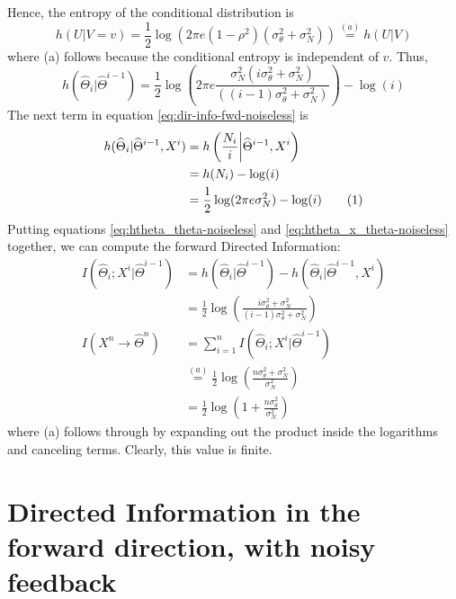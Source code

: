 \documentclass[letterpaper, 10pt, conference]{ieeeconf}
\newcommand\numberthis{\stepcounter{equation}\tag{\theequation}}
\begin{document}
Hence, the entropy of the conditional distribution is
\begin{equation*}
	h(U|V=v)=\frac{1}{2}\log(2\pi e(1-\rho^{2})(\sigma_{\theta}^{2}+\sigma_{N}^{2})) \overset{(a)}{=} h(U|V)
\end{equation*}
where (a) follows because the conditional entropy is independent of $v$. Thus,
\begin{equation}
	h(\widehat{\Theta}_{i}|\widehat{\Theta}^{i-1}) = \frac{1}{2}\log\left(2\pi e\frac{\sigma_{N}^{2}(i\sigma_{\theta}^{2}+\sigma_{N}^{2})}{((i-1)\sigma_{\theta}^{2}+\sigma_{N}^{2})}\right)-\log(i) \label{eq:htheta_theta-noiseless}
\end{equation}
The next term in equation \eqref{eq:dir-info-fwd-noiseless} is
\begin{align*}
	h(\widehat{\Theta}_{i}|\widehat{\Theta}^{i-1},X^{i}) &= h\left(\frac{N_{i}}{i}\bigg|\widehat{\Theta}^{i-1},X^{i}\right) \\
												 &= h(N_{i}) -\log(i) \\
												 &= \frac{1}{2}\log(2\pi e\sigma_{N}^{2}) -\log(i) \numberthis \label{eq:htheta_x_theta-noiseless}
\end{align*}
Putting equations \eqref{eq:htheta_theta-noiseless} and \eqref{eq:htheta_x_theta-noiseless} together, we can compute the forward Directed Information:
\begin{align*}
	I(\widehat{\Theta}_{i};X^{i}|\widehat{\Theta}^{i-1}) &= h(\widehat{\Theta}_{i}|\widehat{\Theta}^{i-1}) - h(\widehat{\Theta}_{i}|\widehat{\Theta}^{i-1},X^{i}) \\
	                                             &= \frac{1}{2}\log\left(\frac{i\sigma_{\theta}^{2}+\sigma_{N}^{2}}{(i-1)\sigma_{\theta}^{2}+\sigma_{N}^{2}}\right) \\
	I(X^{n} \rightarrow \widehat{\Theta}^{n})    &= \sum_{i=1}^{n}I(\widehat{\Theta}_{i};X^{i}|\widehat{\Theta}^{i-1}) \\
												 &\overset{(a)}{=} \frac{1}{2}\log\left(\frac{n\sigma_{\theta}^{2}+\sigma_{N}^{2}}{\sigma_{N}^{2}}\right) \\
	                                             &= \frac{1}{2}\log\left(1+\frac{n\sigma_{\theta}^{2}}{\sigma_{N}^{2}}\right)
\end{align*}
where (a) follows through by expanding out the product inside the logarithms and canceling terms. Clearly, this value is finite.

\section{Directed Information in the forward direction, with noisy feedback}
\label{app:dir-info-fwd-noisy}
\end{document}
